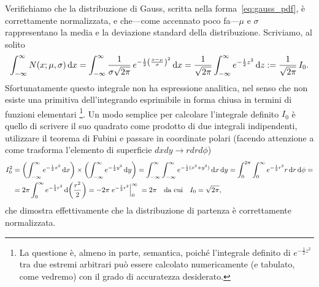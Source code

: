 Verifichiamo che la distribuzione di Gauss, scritta nella
forma~\eqref{eq:gauss_pdf}, è correttamente normalizzata, e che---come
accennato poco fa---$\mu$ e $\sigma$ rappresentano la media e la deviazione
standard della distribuzione. Scriviamo, al solito
\begin{align*}
  \int_{-\infty}^\infty \gausspdf[\mu, \sigma]{x} \diff =
  \int_{-\infty}^\infty \frac{1}{\sigma\sqrt{2\pi}} \,
  e^{-\frac{1}{2}\left(\frac{x-\mu}{\sigma}\right)^2} \diff =
  \frac{1}{\sqrt{2\pi}}\int_{-\infty}^\infty e^{-\frac{1}{2}z^2} \diff[z] :=
  \frac{1}{\sqrt{2\pi}}\,I_0.
\end{align*}
Sfortunatamente questo integrale non ha espressione analitica, nel senso che non
esiste una primitiva dell'integrando esprimibile in forma chiusa in termini di
funzioni elementari%
\footnote{La questione è, almeno in parte, semantica, poiché l'integrale
  definito di $e^{-\frac{1}{2}z^2}$ tra due estremi arbitrari può essere
  calcolato numericamente (e tabulato, come vedremo) con il grado di accuratezza
  desiderato.}.
Un modo semplice per calcolare l'integrale definito $I_0$ è quello di
scrivere il suo quadrato come prodotto di due integrali indipendenti, utilizzare
il teorema di Fubini e passare in coordinate polari (facendo attenzione a come
trasforma l'elemento di superficie $dxdy \rightarrow rdrd\phi$)
\begin{align*}
  I_0^2 & =
  \left(\int_{-\infty}^\infty e^{-\frac{1}{2}x^2} \diff[x]\right) \times
  \left(\int_{-\infty}^\infty e^{-\frac{1}{2}y^2} \diff[y]\right) =
  \int_{-\infty}^\infty\int_{-\infty}^\infty e^{-\frac{1}{2}(x^2 + y^2)} \diff[x]\diff[y] =
  \int_0^{2\pi}\int_0^\infty e^{-\frac{1}{2}r^2}r\diff[r]\diff[\phi] =\\
  & = 2\pi \int_0^\infty e^{-\frac{1}{2}r^2} \diff[\left(\frac{r^2}{2}\right)] =
  -2\pi \eval{e^{-\frac{1}{2}r^2}}{0}{\infty} \;\;\;\; = 2\pi
  \quad \text{da cui} \quad
  I_0 = \sqrt{2\pi},
\end{align*}
che dimostra effettivamente che la distribuzione di partenza è correttamente
normalizzata.

